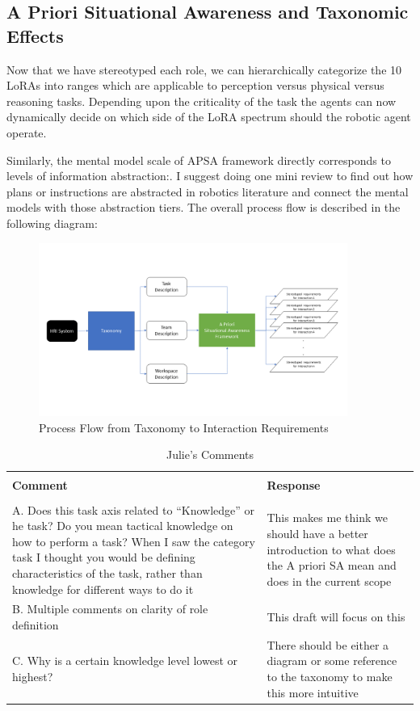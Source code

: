 \documentclass[letterpaper, 10 pt, conference]{ieeeconf} %
\theoremstyle{definition} \newtheorem{definition}{Definition}
\begin{document}
\subsection{A Priori Situational Awareness and Taxonomic Effects}

Now that we have stereotyped each role, we can hierarchically categorize the 10
LoRAs into ranges which are applicable to perception versus physical versus
reasoning tasks. Depending upon the criticality of the task the agents can now
dynamically decide on which side of the LoRA spectrum should the robotic agent
operate.

Similarly, the mental model scale of APSA framework directly corresponds to
levels of information abstraction:. I suggest doing one mini review to find out
how plans or instructions are abstracted in robotics literature and connect the
mental models with those abstraction tiers. The overall process flow is
described in the following diagram:

\begin{figure}[t!]
  \includegraphics[width=0.9\textwidth]{apsa.png}
  \caption{Process Flow from Taxonomy to Interaction Requirements}
\end{figure}

\begin{table}[b!]
  \caption{Julie's Comments}
  \begin{tabular}{p{8cm} p{8cm}}
    \toprule \\
    \textbf{Comment} & \textbf{Response} \\
    \midrule \\
    A. Does this task axis related to ``Knowledge'' or he task? Do you mean tactical knowledge on how to
    perform a task? When I saw the category task I thought you would be defining characteristics of
    the task, rather than knowledge for different ways to do it & This makes me think we should
                                                                  have a better introduction to what does the A priori SA mean and does in the current scope \\
    B. Multiple comments on clarity of role definition & This draft will focus on this \\
    C. Why is a certain knowledge level lowest or highest? & There should be either a diagram or some
                                                             reference to the taxonomy to make this more intuitive \\
    \bottomrule
  \end{tabular}
\end{table}
\end{document}
